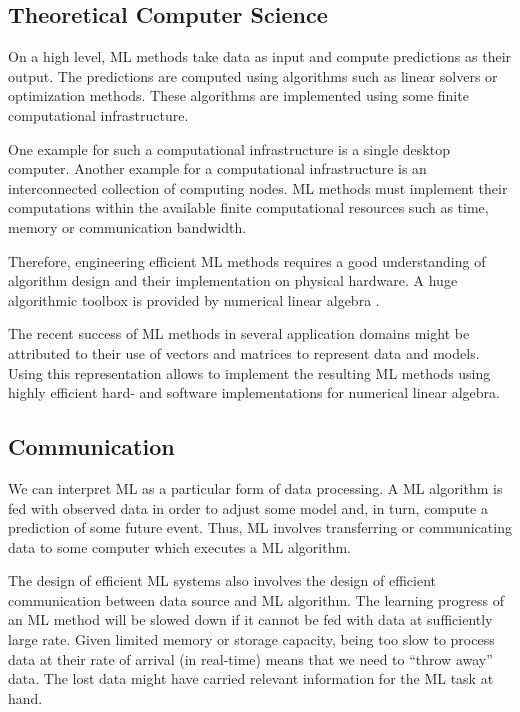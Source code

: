\documentclass[12pt]{report}
\begin{document}
\subsection{Theoretical Computer Science} 

On a high level, ML methods take data as input and compute 
predictions as their output. The predictions are computed 
using algorithms such as linear solvers or optimization methods. 
These algorithms are implemented using some finite computational 
infrastructure. 

One example for such a computational infrastructure is a single 
desktop computer. Another example for a computational infrastructure 
is an interconnected collection of computing nodes. ML methods 
must implement their computations within the available finite computational 
resources such as time, memory or communication bandwidth.  

Therefore, engineering efficient ML methods requires a good 
understanding of algorithm design and their implementation 
on physical hardware. A huge algorithmic toolbox is provided 
by numerical linear algebra \cite{StrangLinAlg2016,Strang2007}. 

The recent success of ML methods in several application domains 
might be attributed to their use of vectors and matrices to represent 
data and models. Using this representation allows to implement the 
resulting ML methods using highly efficient hard- and software 
implementations for numerical linear algebra. 


\subsection{Communication} 

We can interpret ML as a particular form of data processing. 
A ML algorithm is fed with observed data in order to adjust 
some model and, in turn, compute a prediction of some future 
event. Thus, ML involves transferring or communicating 
data to some computer which executes a ML algorithm. 

The design of efficient ML systems also involves the design 
of efficient communication between data source and ML algorithm. 
The learning progress of an ML method will be slowed down 
if it cannot be fed with data at sufficiently large rate. Given 
limited memory or storage capacity, being too slow to process 
data at their rate of arrival (in real-time) means that we need to 
``throw away'' data. The lost data might have carried relevant 
information for the ML task at hand. 
\end{document}
